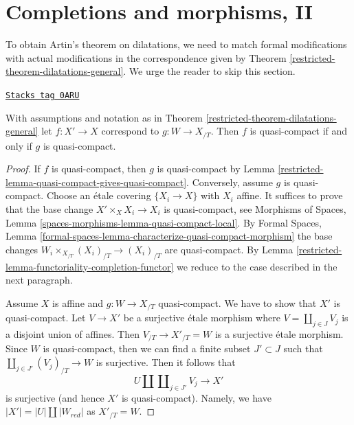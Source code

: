 \section{Completions and morphisms, II}
\label{restricted-section-completion-and-morphisms-bis}
To obtain Artin's theorem on dilatations, we need to match
formal modifications with actual modifications in the correspondence
given by Theorem \ref{restricted-theorem-dilatations-general}.
We urge the reader to skip this section.

\begin{lemma}
\label{restricted-lemma-output-quasi-compact}
\href{https://stacks.math.columbia.edu/tag/0ARU}{\texttt{Stacks tag 0ARU}}

With assumptions and notation as in Theorem \ref{restricted-theorem-dilatations-general}
let $f : X' \to X$ correspond to $g : W \to X_{/T}$.
Then $f$ is quasi-compact if and only if $g$ is quasi-compact.
\end{lemma}

\begin{proof}

If $f$ is quasi-compact, then $g$ is quasi-compact by
Lemma \ref{restricted-lemma-quasi-compact-gives-quasi-compact}.
Conversely, assume $g$ is quasi-compact.
Choose an \'etale covering $\{X_i \to X\}$ with $X_i$ affine.
It suffices to prove that the base change $X' \times_X X_i \to X_i$
is quasi-compact, see
Morphisms of Spaces, Lemma \ref{spaces-morphisms-lemma-quasi-compact-local}.
By Formal Spaces, Lemma
\ref{formal-spaces-lemma-characterize-quasi-compact-morphism}
the base changes $W_i \times_{X_{/T}} (X_i)_{/T}  \to (X_i)_{/T}$
are quasi-compact.
By Lemma \ref{restricted-lemma-functoriality-completion-functor}
we reduce to the case described in the next paragraph.

\medskip\noindent
Assume $X$ is affine and $g : W \to X_{/T}$ quasi-compact.
We have to show that $X'$ is quasi-compact.
Let $V \to X'$ be a surjective \'etale morphism
where $V = \coprod_{j \in J} V_j$ is a disjoint union of affines. Then
$V_{/T} \to X'_{/T} = W$ is a surjective \'etale morphism.
Since $W$ is quasi-compact, then we can find a finite subset
$J' \subset J$ such that $\coprod_{j \in J'} (V_j)_{/T} \to W$ is surjective.
Then it follows that
$$
U \amalg \coprod\nolimits_{j \in J'} V_j \longrightarrow X'
$$
is surjective (and hence $X'$ is quasi-compact).
Namely, we have $|X'| = |U| \amalg |W_{red}|$ as $X'_{/T} = W$.
\end{proof}

